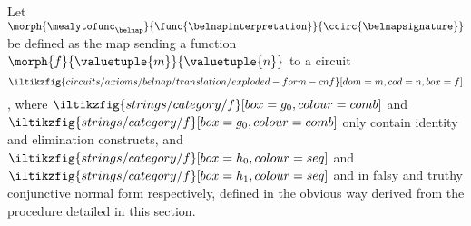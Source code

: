 \begin{definition}
    Let \(\morph{\mealytofunc_\belnap}{\func{\belnapinterpretation}}{\ccirc{\belnapsignature}}\)
    be defined as the map sending a function \(\morph{f}{\valuetuple{m}}{\valuetuple{n}}\)
    to a circuit \[
        \iltikzfig{circuits/axioms/belnap/translation/exploded-form-cnf}[dom=m,cod=n,box=f]
    \], where \(
    \iltikzfig{strings/category/f}[box=g_0,colour=comb]
    \) and \(
    \iltikzfig{strings/category/f}[box=g_0,colour=comb]
    \) only contain identity and elimination constructs, and \(
    \iltikzfig{strings/category/f}[box=h_0,colour=seq]
    \) and \(
    \iltikzfig{strings/category/f}[box=h_1,colour=seq]
    \) and in falsy and truthy conjunctive normal form respectively, defined
    in the obvious way derived from the procedure detailed in this section.
\end{definition}

